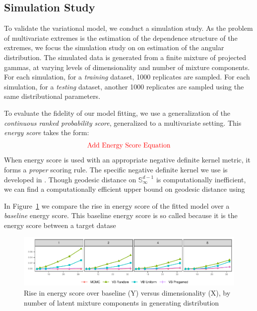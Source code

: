 \subsection{Simulation Study}
To validate the variational model, we conduct a simulation study.
    As the problem of multivariate extremes is the estimation of the dependence
    structure of the extremes, we focus the simulation study on on estimation of
    the angular distribution.  The simulated data is generated from a finite
    mixture of projected gammas, at varying levels of dimensionality and number
    of mixture components.  For each simulation, for a \emph{training} dataset,
    \num{1000} replicates are sampled.  For each simulation, for a 
    \emph{testing} dataset, another \num{1000} replicates are sampled using
    the same distributional parameters.

To evaluate the fidelity of our model fitting, we use a generalization of the
    \emph{continuous ranked probability score}, generalized to a multivariate
    setting.  This \emph{energy score} \citep{gneiting2007} takes the form:
    \[
      \text{\textcolor{red}{Add Energy Score Equation}}  
    \]
    When energy score is used with an appropriate negative definite kernel 
    metric, it forms a \emph{proper} scoring rule. The specific negative 
    definite kernel we use is developed in \cite{trubey:pg}.   Though geodesic
    distance on $\mathbb{S}_{\infty}^{d-1}$ is computationally inefficient, we
    can find a computationally efficient upper bound on geodesic distance using
    
    
    In Figure~\ref{fig:energyscore} we 
    compare the rise in energy score of the fitted
    model over a \emph{baseline} energy score.  This baseline energy score is so
    called because it is the energy score between a target datase


\begin{figure}[ht]
    \caption{Rise in energy score over baseline (Y) versus dimensionality (X), 
            by number of latent mixture components in generating distribution
            \label{fig:energyscore}}
    \includegraphics{./plots/energy_score}
\end{figure}


